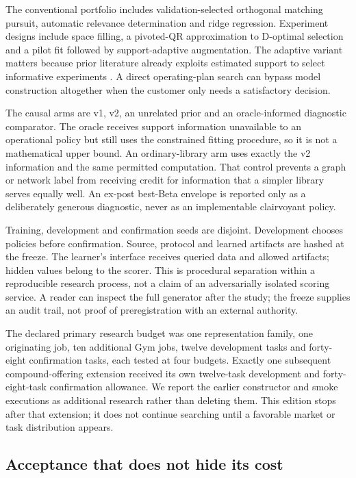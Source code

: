 \documentclass[11pt,letterpaper]{article}
\begin{document}
The conventional portfolio includes validation-selected orthogonal matching pursuit, automatic relevance determination and ridge regression. Experiment designs include space filling, a pivoted-QR approximation to D-optimal selection and a pilot fit followed by support-adaptive augmentation. The adaptive variant matters because prior literature already exploits estimated support to select informative experiments \cite{diaz}. A direct operating-plan search can bypass model construction altogether when the customer only needs a satisfactory decision.

The causal arms are v1, v2, an unrelated prior and an oracle-informed diagnostic comparator. The oracle receives support information unavailable to an operational policy but still uses the constrained fitting procedure, so it is not a mathematical upper bound. An ordinary-library arm uses exactly the v2 information and the same permitted computation. That control prevents a graph or network label from receiving credit for information that a simpler library serves equally well. An ex-post best-Beta envelope is reported only as a deliberately generous diagnostic, never as an implementable clairvoyant policy.

Training, development and confirmation seeds are disjoint. Development chooses policies before confirmation. Source, protocol and learned artifacts are hashed at the freeze. The learner's interface receives queried data and allowed artifacts; hidden values belong to the scorer. This is procedural separation within a reproducible research process, not a claim of an adversarially isolated scoring service. A reader can inspect the full generator after the study; the freeze supplies an audit trail, not proof of preregistration with an external authority.

The declared primary research budget was one representation family, one originating job, ten additional Gym jobs, twelve development tasks and forty-eight confirmation tasks, each tested at four budgets. Exactly one subsequent compound-offering extension received its own twelve-task development and forty-eight-task confirmation allowance. We report the earlier constructor and smoke executions as additional research rather than deleting them. This edition stops after that extension; it does not continue searching until a favorable market or task distribution appears.

\subsection{Acceptance that does not hide its cost}
\end{document}
